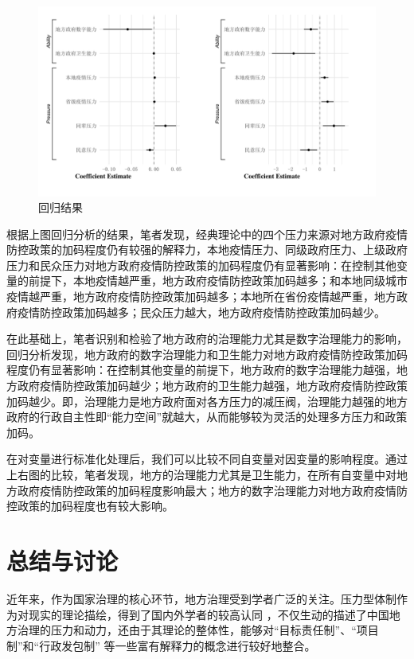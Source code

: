 \documentclass[
  12pt,
]{ctexart}
\begin{document}
\begin{figure}[h]
\includegraphics[width=1\linewidth]{../figures/figure1} \caption{回归结果}\label{fig:unnamed-chunk-5}
\end{figure}

根据上图回归分析的结果，笔者发现，经典理论中的四个压力来源对地方政府疫情防控政策的加码程度仍有较强的解释力，本地疫情压力、同级政府压力、上级政府压力和民众压力对地方政府疫情防控政策的加码程度仍有显著影响：在控制其他变量的前提下，本地疫情越严重，地方政府疫情防控政策加码越多；和本地同级城市疫情越严重，地方政府疫情防控政策加码越多；本地所在省份疫情越严重，地方政府疫情防控政策加码越多；民众压力越大，地方政府疫情防控政策加码越少。

在此基础上，笔者识别和检验了地方政府的治理能力尤其是数字治理能力的影响，回归分析发现，地方政府的数字治理能力和卫生能力对地方政府疫情防控政策加码程度仍有显著影响：在控制其他变量的前提下，地方政府的数字治理能力越强，地方政府疫情防控政策加码越少；地方政府的卫生能力越强，地方政府疫情防控政策加码越少。即，治理能力是地方政府面对各方压力的减压阀，治理能力越强的地方政府的行政自主性即``能力空间''就越大，从而能够较为灵活的处理多方压力和政策加码。

在对变量进行标准化处理后，我们可以比较不同自变量对因变量的影响程度。通过上右图的比较，笔者发现，地方的治理能力尤其是卫生能力，在所有自变量中对地方政府疫情防控政策的加码程度影响最大；地方的数字治理能力对地方政府疫情防控政策的加码程度也有较大影响。

\hypertarget{ux603bux7ed3ux4e0eux8ba8ux8bba}{%
\section{总结与讨论}\label{ux603bux7ed3ux4e0eux8ba8ux8bba}}

近年来，作为国家治理的核心环节，地方治理受到学者广泛的关注。压力型体制作为对现实的理论描绘，得到了国内外学者的较高认同 ，不仅生动的描述了中国地方治理的压力和动力，还由于其理论的整体性，能够对``目标责任制''、``项目制''和``行政发包制'' 等一些富有解释力的概念进行较好地整合。
\end{document}
